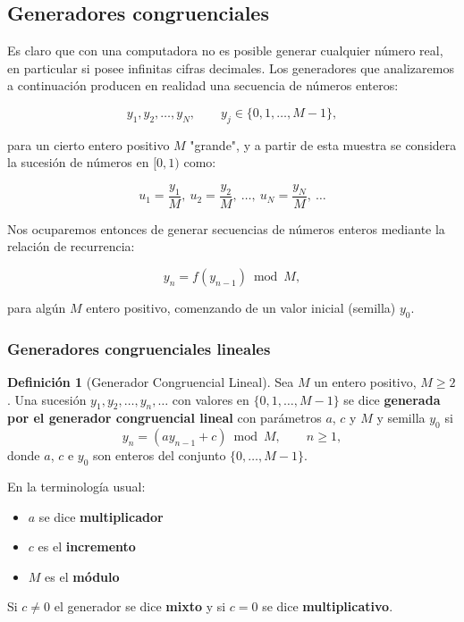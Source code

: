 \documentclass[11pt, a4paper]{article}
\theoremstyle{definition}
\newtheorem{definition}{Definición}
\begin{document}
\subsection{Generadores congruenciales}

Es claro que con una computadora no es posible generar cualquier número real, en particular si posee infinitas cifras decimales. Los generadores que analizaremos a continuación producen en realidad una secuencia de números enteros:

\[
y_{1}, y_{2}, \ldots, y_{N}, \qquad y_{j} \in \{0, 1, \ldots, M-1\},
\]

para un cierto entero positivo $M$ "grande", y a partir de esta muestra se considera la sucesión de números en $[0,1)$ como:

\[
u_{1} = \frac{y_{1}}{M},\ u_{2} = \frac{y_{2}}{M},\ \ldots,\ u_{N} = \frac{y_{N}}{M},\ \ldots
\]

Nos ocuparemos entonces de generar secuencias de números enteros mediante la relación de recurrencia:

\[
y_{n} = f(y_{n-1}) \bmod M,
\]

para algún $M$ entero positivo, comenzando de un valor inicial (semilla) $y_{0}$.


\subsubsection{Generadores congruenciales lineales}

\begin{definition}[Generador Congruencial Lineal]
    Sea $M$ un entero positivo, $M \geq 2$. Una sucesión $y_{1}, y_{2}, \ldots, y_{n}, \ldots$ con valores en $\{0,1,\ldots,M-1\}$ se dice \textbf{generada por el generador congruencial lineal} con parámetros $a$, $c$ y $M$ y semilla $y_{0}$ si
    \[
    y_{n} = (a y_{n-1} + c) \bmod M, \qquad n \geq 1,
    \]
    donde $a$, $c$ e $y_{0}$ son enteros del conjunto $\{0,\ldots,M-1\}$.
    
    En la terminología usual:
    \begin{itemize}
        \item $a$ se dice \textbf{multiplicador}
        \item $c$ es el \textbf{incremento}
        \item $M$ es el \textbf{módulo}
    \end{itemize}
    
    Si $c \neq 0$ el generador se dice \textbf{mixto} y si $c = 0$ se dice \textbf{multiplicativo}.
    \end{definition}
\end{document}
